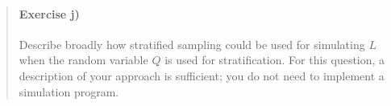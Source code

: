 \documentclass[11pt]{article}
\begin{document}
    \begin{quote}
\mbox{}%
\paragraph{Exercise j)}\label{exercise-j}

Describe broadly how stratified sampling could be used for simulating
\(L\) when the random variable \(Q\) is used for stratification. For
this question, a description of your approach is sufficient; you do not
need to implement a simulation program.
\end{quote}


    
    
    
\end{document}

